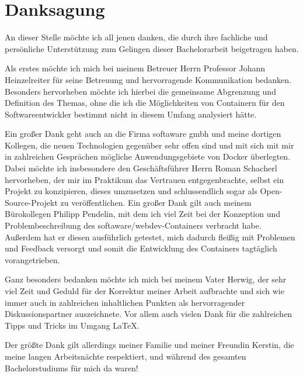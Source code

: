 \chapter*{Danksagung}
An dieser Stelle möchte ich all jenen danken, die durch ihre fachliche und persönliche Unterstützung zum Gelingen dieser Bachelorarbeit beigetragen haben.

Als erstes möchte ich mich bei meinem Betreuer Herrn Professor Johann Heinzelreiter für seine Betreuung und hervorragende Kommunikation bedanken.
Besonders hervorheben möchte ich hierbei die gemeinsame Abgrenzung und Definition des Themas, ohne die ich die Möglichkeiten von Containern für den Softwareentwickler bestimmt nicht in diesem Umfang analysiert hätte.

Ein großer Dank geht auch an die Firma softaware gmbh und meine dortigen Kollegen, die neuen Technologien gegenüber sehr offen sind und mit sich mit mir in zahlreichen Gesprächen mögliche Anwendungsgebiete von Docker überlegten.
Dabei möchte ich insbesondere den Geschäftsführer Herrn Roman Schacherl hervorheben, der mir im Praktikum das Vertrauen entgegenbrachte, selbst ein Projekt zu konzipieren, dieses umzusetzen und schlussendlich sogar als Open-Source-Projekt zu veröffentlichen.
Ein großer Dank gilt auch meinem Bürokollegen Philipp Pendelin, mit dem ich viel Zeit bei der Konzeption und Problembeschreibung des softaware/webdev-Containers verbracht habe.
Außerdem hat er diesen ausführlich getestet, mich dadurch fleißig mit Problemen und Feedback versorgt und somit die Entwicklung des Containers tagtäglich vorangetrieben.

Ganz besonders bedanken möchte ich mich bei meinem Vater Herwig, der sehr viel Zeit und Geduld für der Korrektur meiner Arbeit aufbrachte und sich wie immer auch in zahlreichen inhaltlichen Punkten als hervorragender Diskussionspartner auszeichnete.
Vor allem auch vielen Dank für die zahlreichen Tipps und Tricks im Umgang \LaTeX.

Der größte Dank gilt allerdings meiner Familie und meiner Freundin Kerstin, die meine langen Arbeitsnächte respektiert, und während des gesamten Bachelorstudiums für mich da waren!
